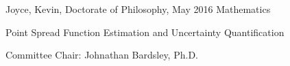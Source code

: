 %
%
\setcounter{page}{2}                    %
%
%

Joyce, Kevin, Doctorate of Philosophy, May 2016 \hfill Mathematics
   
Point Spread Function Estimation and Uncertainty Quantification

%
Committee Chair: Johnathan Bardsley, Ph.D.    %
%
\setlength{\parindent}{2ex}
%
%
%
%
%
\pagebreak
